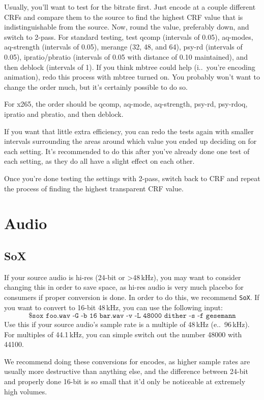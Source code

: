 \documentclass{scrartcl}
\begin{document}
Usually, you'll want to test for the bitrate first.  Just encode at a couple different CRFs and compare them to the source to find the highest CRF value that is indistinguishable from the source.  Now, round the value, preferably down, and switch to 2-pass.  For standard testing, test qcomp (intervals of 0.05), aq-modes, aq-strength (intervals of 0.05), merange (32, 48, and 64), psy-rd (intervals of 0.05), ipratio/pbratio (intervals of 0.05 with distance of 0.10 maintained), and then deblock (intervals of 1).  If you think mbtree could help (i.\@e.\ you're encoding animation), redo this process with mbtree turned on.  You probably won't want to change the order much, but it's certainly possible to do so.

For x265, the order should be qcomp, aq-mode, aq-strength, psy-rd, psy-rdoq, ipratio and pbratio, and then deblock.

If you want that little extra efficiency, you can redo the tests again with smaller intervals surrounding the areas around which value you ended up deciding on for each setting.  It's recommended to do this after you've already done one test of each setting, as they do all have a slight effect on each other.

Once you're done testing the settings with 2-pass, switch back to CRF and repeat the process of finding the highest transparent CRF value.

\section{Audio}

\subsection{SoX}

If your source audio is hi-res (24-bit or >48\,kHz), you may want to consider changing this in order to save space, as hi-res audio is very much placebo for consumers if proper conversion is done.  In order to do this, we recommend \texttt{SoX}.  If you want to convert to 16-bit 48\,kHz, you can use the following input:
\[
\texttt{\$ sox foo.wav -G -b 16 bar.wav -v -L 48000 dither -s -f gesemann}
\]
Use this if your source audio's sample rate is a multiple of 48\,kHz (e.\@g.\ 96\,kHz).  For multiples of 44.1\,kHz, you can simple switch out the number 48000 with 44100.

We recommend doing these conversions for encodes, as higher sample rates are usually more destructive than anything else, and the difference between 24-bit and properly done 16-bit is so small that it'd only be noticeable at extremely high volumes.
\end{document}
